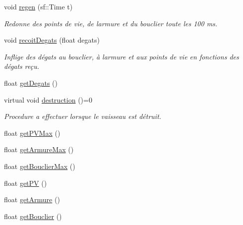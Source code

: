 \begin{DoxyCompactItemize}
void \hyperlink{class_entite_ac45ceffbeb11cbae7dca26fde5865b85}{regen} (sf\+::\+Time t)
\begin{DoxyCompactList}\small\item\em Redonne des points de vie, de l\textquotesingle{}armure et du bouclier toute les 100 ms. \end{DoxyCompactList}\item 
void \hyperlink{class_entite_ab16c58f618b3b854310f92f044cc4a17}{recoit\+Degats} (float degats)
\begin{DoxyCompactList}\small\item\em Inflige des dégats au bouclier, à l\textquotesingle{}armure et aux points de vie en fonctions des dégats reçu. \end{DoxyCompactList}\item 
float \hyperlink{class_entite_aec50d0b36c1cbe54054f7c469efc581a}{get\+Degats} ()
\item 
virtual void \hyperlink{class_entite_af5c424f69b2c880ae9c12786abd28592}{destruction} ()=0
\begin{DoxyCompactList}\small\item\em Procedure a effectuer lorsque le vaisseau est détruit. \end{DoxyCompactList}\item 
float \hyperlink{class_entite_ac55a0e2b2667fda98e47d7057675d295}{get\+P\+V\+Max} ()
\item 
float \hyperlink{class_entite_a8c7e378e1fb1567d4320647ea1cdfa83}{get\+Armure\+Max} ()
\item 
float \hyperlink{class_entite_a31d930fa852c6254f300927b86dfcf57}{get\+Bouclier\+Max} ()
\item 
float \hyperlink{class_entite_ad6e34d82273566ceb7680a5d783af504}{get\+PV} ()
\item 
float \hyperlink{class_entite_af22df9c9309e6dc5f4c544ff4d462848}{get\+Armure} ()
\item 
float \hyperlink{class_entite_a9f5f0e61edacb8d16ab5a8e65fc987a8}{get\+Bouclier} ()
\end{DoxyCompactItemize}
